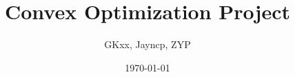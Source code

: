 \documentclass{beamer}
\title{Convex Optimization Project}
\author{GKxx, Jayncp, ZYP}
\date{\today}
\begin{document}
\begin{frame}
    \maketitle
\end{frame}
\end{document}
